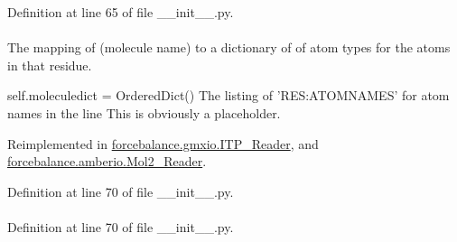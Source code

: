 \-Definition at line 65 of file \-\_\-\-\_\-init\-\_\-\-\_\-.\-py.

\hypertarget{classforcebalance_1_1BaseReader_ab444c213e15929253dd73395ac5f19fc}{
\paragraph[{molatom}]{}}\label{classforcebalance_1_1BaseReader_ab444c213e15929253dd73395ac5f19fc}


\-The mapping of (molecule name) to a dictionary of of atom types for the atoms in that residue. 

self.\-moleculedict = \-Ordered\-Dict() \-The listing of '\-R\-E\-S\-:\-A\-T\-O\-M\-N\-A\-M\-E\-S' for atom names in the line \-This is obviously a placeholder. 

\-Reimplemented in \hyperlink{classforcebalance_1_1gmxio_1_1ITP__Reader_a5ed800499e9442adaea0cee243960f94}{forcebalance.\-gmxio.\-I\-T\-P\-\_\-\-Reader}, and \hyperlink{classforcebalance_1_1amberio_1_1Mol2__Reader_acdeaabdae39b208fb9430ee4cd6de113}{forcebalance.\-amberio.\-Mol2\-\_\-\-Reader}.



\-Definition at line 70 of file \-\_\-\-\_\-init\-\_\-\-\_\-.\-py.

\hypertarget{classforcebalance_1_1BaseReader_a4369b5fb663a83b11602daa71db6862e}{
\paragraph[{\-Molecules}]{}}\label{classforcebalance_1_1BaseReader_a4369b5fb663a83b11602daa71db6862e}


\-Definition at line 70 of file \-\_\-\-\_\-init\-\_\-\-\_\-.\-py.

